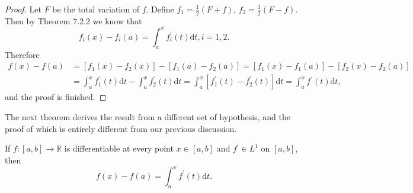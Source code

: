 \begin{proof}
Let $F$ be the total variation of $f$. Define $f_1=\frac{1}{2}(F+f)$, $f_2=\frac{1}{2}(F-f)$. Then by Theorem 7.2.2 we know that 
$$
f_i\left( x \right) -f_i\left( a \right) =\int_a^x{f_{i}^{\prime}\left( t \right) \mathrm{d}t},i=1,2.
$$
Therefore 
$$
\begin{aligned}
f\left( x \right) -f\left( a \right) &=\left[ f_1\left( x \right) -f_2\left( x \right) \right] -\left[ f_1\left( a \right) -f_2\left( a \right) \right] =\left[ f_1\left( x \right) -f_1\left( a \right) \right] -\left[ f_2\left( x \right) -f_2\left( a \right) \right] 
\\
&=\int_a^x{f_{1}^{\prime}\left( t \right) \mathrm{d}t}-\int_a^x{f_{2}^{\prime}\left( t \right) \mathrm{d}t}=\int_a^x{\left[ f_{1}^{\prime}\left( t \right) -f_{2}^{\prime}\left( t \right) \right] \mathrm{d}t}=\int_a^x{f^{\prime}\left( t \right) \mathrm{d}t},
\end{aligned}
$$
and the proof is finished.
\end{proof}
The next theorem derives the result from a different set of hypothesis, and the proof of which is entirely different from our previous discussion.
\begin{theorem}
If $f:[a,b]\to\mathbb{R}$ is differentiable at every point $x\in [a,b]$ and $f^\prime\in L^1$ on $[a,b]$, then 
$$
f\left( x \right) -f\left( a \right) =\int_a^x{f^{\prime}\left( t \right) \mathrm{d}t}.
$$
\end{theorem}
